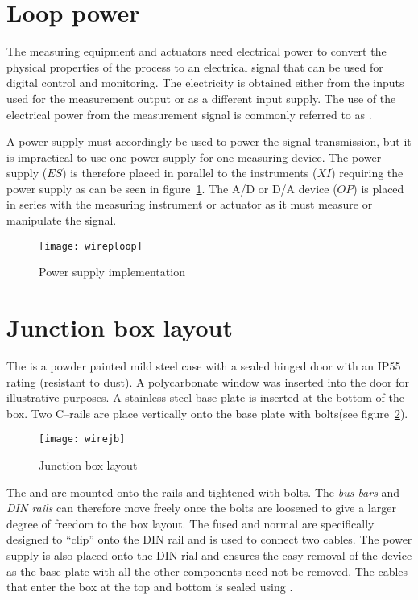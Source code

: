 \section{Loop power}
The measuring equipment and actuators need electrical power to convert the physical properties of the process to an electrical signal that can be used for digital control and monitoring. The electricity is obtained either from the inputs used for the measurement output or as a different input supply. The use of the electrical power from the measurement signal is commonly referred to as . 

A power supply must accordingly be used to power the signal transmission, but it is impractical to use one power supply for one measuring device. The power supply ($ES$) is therefore placed in parallel to the instruments ($XI$) requiring the power supply as can be seen in figure~\ref{fig:wire:ploop}. The A/D or D/A device ($OP$) is placed in series with the measuring instrument or actuator as it must measure or manipulate the signal. 
\begin{figure}[htbp]
	\centering
	\texttt{[image: wireploop]}
	\caption{Power supply implementation}
	\label{fig:wire:ploop}
\end{figure}

\section{Junction box layout}
The  is a powder painted mild steel case with a sealed hinged door with an IP55 rating (resistant to dust). A polycarbonate window was inserted into the door for illustrative purposes. A stainless steel base plate is inserted at the bottom of the box. Two C--rails are place vertically onto the base plate with bolts(see figure~\ref{fig:wire:jb}). 
\begin{figure}[p]
	\centering
	\texttt{[image: wirejb]}
	\caption{Junction box layout}
	\label{fig:wire:jb}
\end{figure}

The  and  are mounted onto the rails and tightened with bolts. The \emph{bus bars} and \emph{DIN rails} can therefore move freely once the bolts are loosened to give a larger degree of freedom to the box layout. The fused and normal  are specifically designed to ``clip'' onto the DIN rail and is used to connect two cables. The power supply is also placed onto the DIN rial and ensures the easy removal of the device as the base plate with all the other components need not be removed. The cables that enter the box at the top and bottom is sealed using . 

